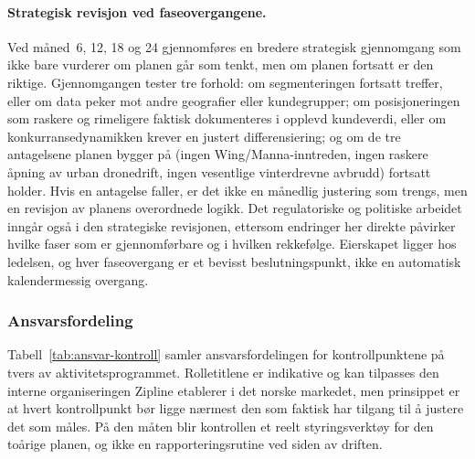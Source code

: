 \paragraph{Strategisk revisjon ved faseovergangene.}
Ved måned~6, 12, 18 og 24 gjennomføres en bredere strategisk
gjennomgang som ikke bare vurderer om planen går som tenkt, men om
planen fortsatt er den riktige. Gjennomgangen tester tre forhold: om
segmenteringen fortsatt treffer, eller om data peker mot andre
geografier eller kundegrupper; om posisjoneringen som raskere og
rimeligere faktisk dokumenteres i opplevd kundeverdi, eller om
konkurransedynamikken krever en justert differensiering; og om de tre
antagelsene planen bygger på (ingen Wing/Manna-inntreden, ingen raskere
åpning av urban dronedrift, ingen vesentlige vinterdrevne avbrudd)
fortsatt holder. Hvis en antagelse faller, er det ikke en månedlig
justering som trengs, men en revisjon av planens overordnede logikk. Det
regulatoriske og politiske arbeidet inngår også i den strategiske
revisjonen, ettersom endringer her direkte påvirker hvilke faser som er
gjennomførbare og i hvilken rekkefølge. Eierskapet ligger hos ledelsen,
og hver faseovergang er et bevisst beslutningspunkt, ikke en automatisk
kalendermessig overgang.

\subsubsection{Ansvarsfordeling}

Tabell~\ref{tab:ansvar-kontroll} samler ansvarsfordelingen for
kontrollpunktene på tvers av aktivitetsprogrammet. Rolletitlene er
indikative og kan tilpasses den interne organiseringen Zipline etablerer
i det norske markedet, men prinsippet er at hvert kontrollpunkt bør
ligge nærmest den som faktisk har tilgang til å justere det som måles.
På den måten blir kontrollen et reelt styringsverktøy for den toårige
planen, og ikke en rapporteringsrutine ved siden av driften.

